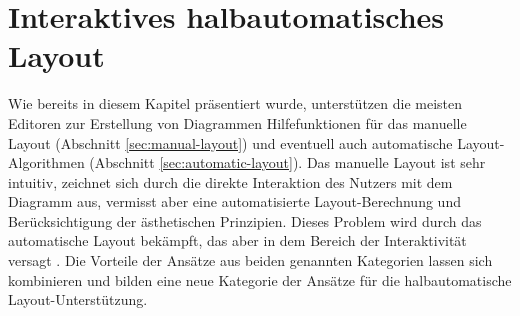 











\section{Interaktives halbautomatisches Layout}
\label{sec:interactive-semi-automatic-layout}

Wie bereits in diesem Kapitel präsentiert wurde, unterstützen die meisten Editoren zur Erstellung von Diagrammen Hilfefunktionen für das manuelle Layout (Abschnitt \ref{sec:manual-layout}) und eventuell auch automatische Layout-Algorithmen (Abschnitt \ref{sec:automatic-layout}). Das manuelle Layout ist sehr intuitiv, zeichnet sich durch die direkte Interaktion des Nutzers mit dem Diagramm aus, vermisst aber eine automatisierte Layout-Berechnung und Berücksichtigung der ästhetischen Prinzipien. Dieses Problem wird durch das automatische Layout bekämpft, das aber in dem Bereich der Interaktivität versagt \cite{GladischSchumann14Semi-Automatic}. Die Vorteile der Ansätze aus beiden genannten Kategorien lassen sich kombinieren und bilden eine neue Kategorie der Ansätze für die halbautomatische Layout-Unterstützung.

